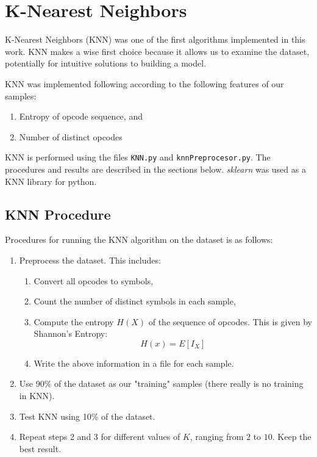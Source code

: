 \documentclass[12pt]{article}
\begin{document}
\section{K-Nearest Neighbors}
K-Nearest Neighbors (KNN) was one of the first algorithms implemented in this work. KNN makes a wise first choice because it allows us to examine the dataset, potentially for intuitive solutions to building a model.

KNN was implemented following according to the following features of our samples:
  \begin{enumerate}
    \item Entropy of opcode sequence, and
    \item Number of distinct opcodes
  \end{enumerate}
  KNN is performed using the files \texttt{KNN.py} and \texttt{knnPreprocesor.py}. The procedures and results are described in the sections below. \textit{sklearn} was used as a KNN library for python.

\subsection{KNN Procedure}
  Procedures for running the KNN algorithm on the dataset is as follows:
  \begin{enumerate}
    \item Preprocess the dataset. This includes:
        \begin{enumerate}
          \item Convert all opcodes to symbols,
          \item Count the number of distinct symbols in each sample,
          \item Compute the entropy $H(X)$ of the sequence of opcodes. This is given by Shannon's Entropy:
          \begin{equation}
            H(x) = E[I_X] 
          \end{equation}
        \item Write the above information in a file for each sample.
        \end{enumerate}
      \item Use 90\% of the dataset as our "training" samples (there really is no training in KNN).
      \item Test KNN using 10\% of the dataset.
      \item Repeat steps 2 and 3 for different values of $K$, ranging from $2$ to $10$. Keep the best result.
  \end{enumerate}
\end{document}
